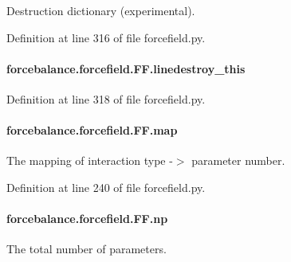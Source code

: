 Destruction dictionary (experimental). 



Definition at line 316 of file forcefield.\-py.

\hypertarget{classforcebalance_1_1forcefield_1_1FF_ab2ca57079cb49527775d044a2b2db6db}{
\paragraph[{linedestroy\-\_\-this}]{\setlength{\rightskip}{0pt plus 5cm}forcebalance.\-forcefield.\-F\-F.\-linedestroy\-\_\-this}}\label{classforcebalance_1_1forcefield_1_1FF_ab2ca57079cb49527775d044a2b2db6db}


Definition at line 318 of file forcefield.\-py.

\hypertarget{classforcebalance_1_1forcefield_1_1FF_adac6add3391d052c319902ccc8e0a617}{
\paragraph[{map}]{\setlength{\rightskip}{0pt plus 5cm}forcebalance.\-forcefield.\-F\-F.\-map}}\label{classforcebalance_1_1forcefield_1_1FF_adac6add3391d052c319902ccc8e0a617}


The mapping of interaction type -\/$>$ parameter number. 



Definition at line 240 of file forcefield.\-py.

\hypertarget{classforcebalance_1_1forcefield_1_1FF_a19eb80acc94a49f9ff806f13a95fef66}{
\paragraph[{np}]{\setlength{\rightskip}{0pt plus 5cm}forcebalance.\-forcefield.\-F\-F.\-np}}\label{classforcebalance_1_1forcefield_1_1FF_a19eb80acc94a49f9ff806f13a95fef66}


The total number of parameters. 



